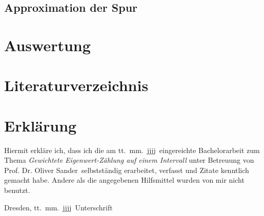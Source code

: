 \documentclass[a4paper,12pt]{report}
\newcommand{\betreuer}{Prof. Dr. Oliver Sander}
\newcommand{\thema}{Gewichtete Eigenwert-Zählung auf einem Intervall}
\newcommand{\datum}{tt.\ mm.\ jjjj} %
\newcommand{\1}{\mathds{1}}
\theoremstyle{plain} %
\theoremstyle{definition} %
\theoremstyle{remark}
\begin{document}
      \section{Approximation der Spur}

\chapter{Auswertung}
\label{sec: Auswertung}

\chapter{Literaturverzeichnis}

      \printbibliography

\chapter*{Erkl\"{a}rung}
\thispagestyle{empty}
Hiermit erkl\"{a}re ich, dass ich die am \datum\ eingereichte Bachelorarbeit zum Thema
\emph{\thema} unter Betreuung von \betreuer\ selbstst\"{a}ndig erarbeitet,
verfasst und Zitate kenntlich gemacht habe. Andere als die angegebenen Hilfsmittel
wurden von mir nicht benutzt.

\bigskip \bigskip \bigskip \bigskip \bigskip

Dresden, \datum\ \hfill Unterschrift

\normalsize
\end{document}
